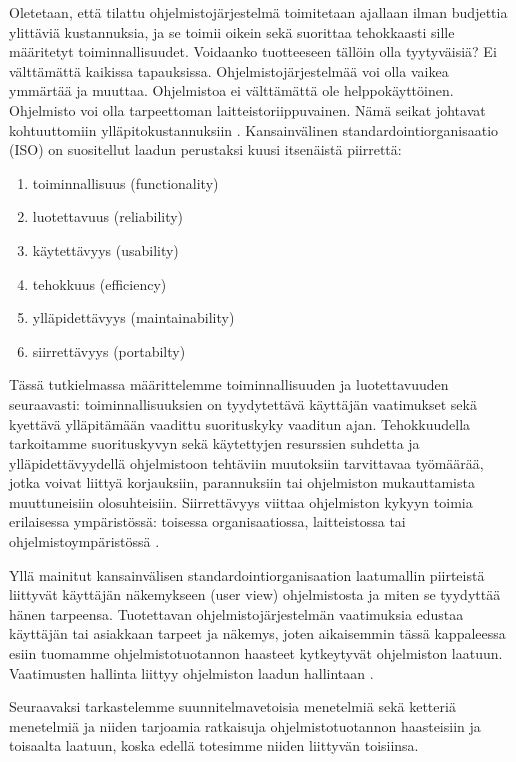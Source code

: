 \documentclass[finnish]{tktltiki2}
\theoremstyle{definition}
\theoremstyle{remark}
\begin{document}
Oletetaan, että tilattu ohjelmistojärjestelmä toimitetaan ajallaan ilman budjettia ylittäviä kustannuksia, ja se toimii oikein sekä suorittaa tehokkaasti sille määritetyt toiminnallisuudet. Voidaanko tuotteeseen tällöin olla tyytyväisiä? Ei välttämättä kaikissa tapauksissa. Ohjelmistojärjestelmää voi olla vaikea ymmärtää ja muuttaa. Ohjelmistoa ei välttämättä ole helppokäyttöinen. Ohjelmisto voi olla tarpeettoman laitteistoriippuvainen. Nämä seikat johtavat kohtuuttomiin ylläpitokustannuksiin \cite{BBL76}.
Kansainvälinen standardointiorganisaatio (ISO) on suositellut laadun perustaksi kuusi itsenäistä piirrettä: \cite{KIP96}

\begin{enumerate}
\item toiminnallisuus (functionality)
\item luotettavuus (reliability)
\item käytettävyys (usability)
\item tehokkuus (efficiency)
\item ylläpidettävyys (maintainability)
\item siirrettävyys (portabilty)
\end{enumerate}

Tässä tutkielmassa määrittelemme toiminnallisuuden ja luotettavuuden seuraavasti: toiminnallisuuksien on tyydytettävä käyttäjän vaatimukset sekä kyettävä ylläpitämään vaadittu suorituskyky vaaditun ajan. Tehokkuudella tarkoitamme suorituskyvyn sekä käytettyjen resurssien suhdetta ja yllä\-pidettävyydellä ohjelmistoon tehtäviin muutoksiin tarvittavaa työmäärää, jotka voivat liittyä korjauksiin, parannuksiin tai ohjelmiston mukauttamista muuttuneisiin olosuhteisiin. Siirrettävyys viittaa ohjelmiston kykyyn toimia erilaisessa ympäristössä: toisessa organisaatiossa, laitteistossa tai ohjelmistoympäristössä \cite{KIP96}.

Yllä mainitut kansainvälisen standardointiorganisaation laatumallin piirteistä liittyvät käyttäjän näkemykseen (user view) ohjelmistosta ja miten se tyydyttää hänen tarpeensa. Tuotettavan ohjelmistojärjestelmän vaatimuksia edustaa käyttäjän tai asiakkaan tarpeet ja näkemys, joten aikaisemmin tässä kappaleessa esiin tuomamme ohjelmistotuotannon haasteet kytkeytyvät ohjelmiston laatuun. Vaatimusten hallinta liittyy ohjelmiston laadun hallintaan \cite{KIP96}.

Seuraavaksi tarkastelemme suunnitelmavetoisia menetelmiä sekä ketteriä menetelmiä ja niiden tarjoamia ratkaisuja ohjelmistotuotannon haasteisiin ja toisaalta laatuun, koska edellä totesimme niiden liittyvän toisiinsa. 
\end{document}
